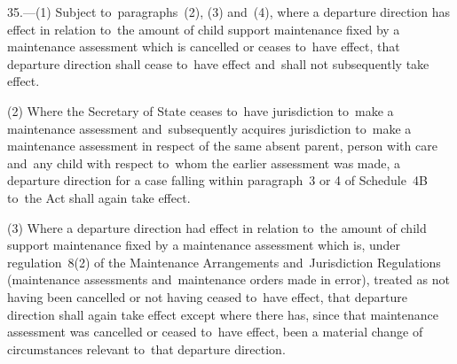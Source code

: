 \documentclass[12pt,a4paper]{article}
\begin{document}
35.—(1) Subject to~paragraphs~(2), (3) and~(4), where a departure direction has effect in relation to~the amount of child support maintenance fixed by a maintenance assessment which is cancelled or ceases to~have effect, that departure direction shall cease to~have effect and~shall not subsequently take effect.

(2) Where 
the Secretary of State  %
ceases to~have jurisdiction to~make a maintenance assessment and~subsequently acquires jurisdiction to~make a maintenance assessment in respect of the same absent parent, person with care and~any child with respect to~whom the earlier assessment was made, a departure direction for a case falling within paragraph~3 or 4 of Schedule~4B to~the Act shall again take effect. 

(3) Where a departure direction had effect in relation to~the amount of child support maintenance fixed by a maintenance assessment which is, under regulation~8(2) of the Maintenance Arrangements and~Jurisdiction Regulations (maintenance assessments and~maintenance orders made in error), treated as not having been cancelled or not having ceased to~have effect, that departure direction shall again take effect 
except where there has, since that maintenance assessment was cancelled or ceased to~have effect, been a material change of circumstances relevant to~that departure direction.
\end{document}
